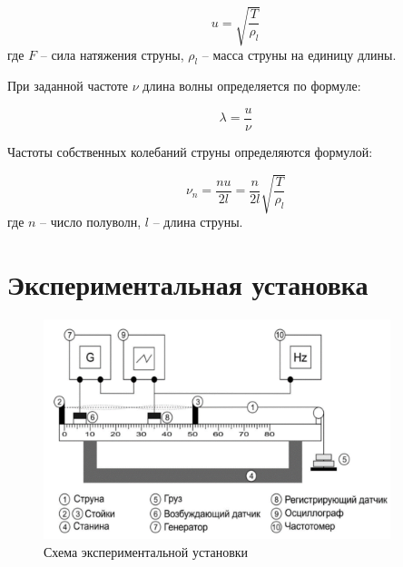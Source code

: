 \documentclass[a4paper,12pt]{article}
\begin{document}
	\begin{equation}
		u = \sqrt{\frac{T}{\rho_l}}
		\label{velocity_of_deformation}
	\end{equation}
	где $F$ -- сила натяжения струны, $\rho_{l}$ -- масса струны на единицу длины.
	
	При заданной частоте $\nu$ длина волны определяется по формуле:
	
	\begin{equation}
		\lambda = \frac{u}{\nu}
	\end{equation}
	
	Частоты собственных колебаний струны определяются формулой:
	
	\begin{equation}
		\nu_{n} = \frac{nu}{2l} = \frac{n}{2l}\sqrt{\frac{T}{\rho_l}}
		\label{frequency_velocity_equation}
	\end{equation}
	где $n$ -- число полуволн, $l$ -- длина струны.
	
	\section{Экспериментальная установка}
	
	\begin{figure}[h!]
		\begin{center}
			\includegraphics[width = 0.9\textwidth]{Screenshot 2023-10-04 133410.png}
			\caption{Схема экспериментальной установки}
			\label{facility}
		\end{center}
	\end{figure}
	
\end{document}
